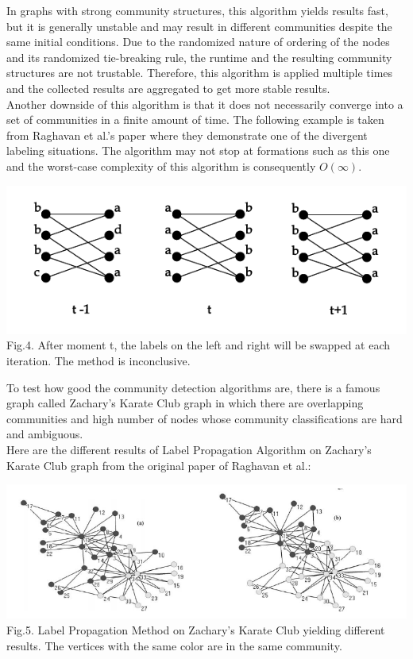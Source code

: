 \documentclass[10pt]{article}
\begin{document}
In graphs with strong community structures, this algorithm yields results fast\cite{raghavan}, but it is generally unstable and may result in different communities despite the same initial conditions. Due
to the randomized nature of ordering of the nodes and its randomized tie-breaking rule, the runtime and the resulting community structures are not trustable. Therefore, this algorithm is applied multiple times and the collected results are aggregated to get more stable results. \\

Another downside of this algorithm is that it does not necessarily converge into a set of communities in a finite amount of time. The following example is taken from Raghavan et al.’s paper where they demonstrate one of the divergent labeling situations. The algorithm may not stop at formations such as this one and the worst-case complexity of this algorithm is consequently $O(\infty )$. \\

\begin{center}
    \includegraphics[scale=0.7]{labelPropLoop.png} \\
    Fig.4. After moment t, the labels on the left and right will be swapped at each iteration. The method is inconclusive. \cite{raghavan}
\end{center}

To test how good the community detection algorithms are, there is a famous graph called Zachary’s Karate Club graph in which there are overlapping communities and high number of nodes whose community classifications are hard and ambiguous. \\

Here are the different results of Label Propagation Algorithm on Zachary’s Karate Club graph from the original paper of Raghavan et al.: \\

\begin{center}
    \includegraphics[scale=0.5]{labelPropKarateClub.png} \\
    Fig.5. Label Propagation Method on Zachary’s Karate Club yielding different results. The vertices with the same color are in the same community\cite{raghavan}.
\end{center}
\end{document}
